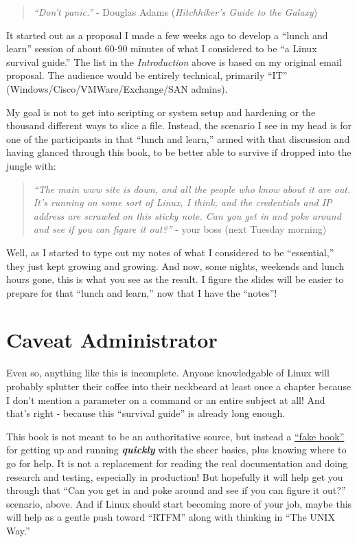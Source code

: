 \documentclass[10pt,]{book}
\numberwithin{figure}{chapter}
\begin{document}
\begin{quote}
\emph{``Don't panic.''} - Douglas Adams (\emph{Hitchhiker's Guide to the
Galaxy})
\end{quote}

It started out as a proposal I made a few weeks ago to develop a ``lunch
and learn'' session of about 60-90 minutes of what I considered to be
``a Linux survival guide.'' The list in the \emph{Introduction} above is
based on my original email proposal. The audience would be entirely
technical, primarily ``IT'' (Windows/Cisco/VMWare/Exchange/SAN admins).

My goal is not to get into scripting or system setup and hardening or
the thousand different ways to slice a file. Instead, the scenario I see
in my head is for one of the participants in that ``lunch and learn,''
armed with that discussion and having glanced through this book, to be
better able to survive if dropped into the jungle with:

\begin{quote}
\emph{``The main www site is down, and all the people who know about it
are out. It's running on some sort of Linux, I think, and the
credentials and IP address are scrawled on this sticky note. Can you get
in and poke around and see if you can figure it out?''} - your boss
(next Tuesday morning)
\end{quote}

Well, as I started to type out my notes of what I considered to be
``essential,'' they just kept growing and growing. And now, some nights,
weekends and lunch hours gone, this is what you see as the result. I
figure the slides will be easier to prepare for that ``lunch and
learn,'' now that I have the ``notes''!

\section{Caveat Administrator}\label{caveat-administrator}

Even so, anything like this is incomplete. Anyone knowledgable of Linux
will probably splutter their coffee into their neckbeard at least once a
chapter because I don't mention a parameter on a command or an entire
subject at all! And that's right - because this ``survival guide'' is
already long enough.

This book is not meant to be an authoritative source, but instead a
\href{https://en.wikipedia.org/wiki/Fake_book}{``fake book''} for
getting up and running \textbf{\emph{quickly}} with the sheer basics,
plus knowing where to go for help. It is not a replacement for reading
the real documentation and doing research and testing, especially in
production! But hopefully it will help get you through that ``Can you
get in and poke around and see if you can figure it out?'' scenario,
above. And if Linux should start becoming more of your job, maybe this
will help as a gentle push toward ``RTFM'' along with thinking in ``The
UNIX Way.''
\end{document}
